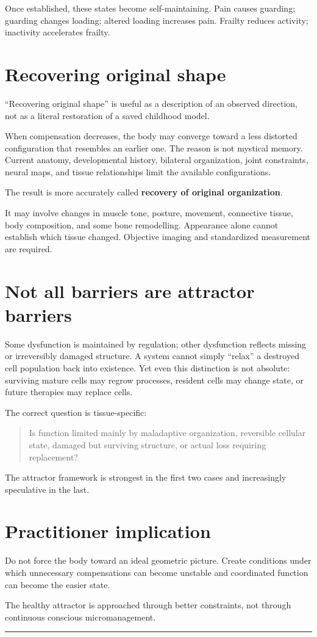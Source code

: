 Once established, these states become self-maintaining. Pain causes guarding; guarding changes loading; altered loading increases pain. Frailty reduces activity; inactivity accelerates frailty.

\section{Recovering original shape}

``Recovering original shape'' is useful as a description of an observed direction, not as a literal restoration of a saved childhood model.

When compensation decreases, the body may converge toward a less distorted configuration that resembles an earlier one. The reason is not mystical memory. Current anatomy, developmental history, bilateral organization, joint constraints, neural maps, and tissue relationships limit the available configurations.

The result is more accurately called \textbf{recovery of original organization}.

It may involve changes in muscle tone, posture, movement, connective tissue, body composition, and some bone remodelling. Appearance alone cannot establish which tissue changed. Objective imaging and standardized measurement are required.

\section{Not all barriers are attractor barriers}

Some dysfunction is maintained by regulation; other dysfunction reflects missing or irreversibly damaged structure. A system cannot simply ``relax'' a destroyed cell population back into existence. Yet even this distinction is not absolute: surviving mature cells may regrow processes, resident cells may change state, or future therapies may replace cells.

The correct question is tissue-specific:

\begin{quote}
Is function limited mainly by maladaptive organization, reversible cellular state, damaged but surviving structure, or actual loss requiring replacement?
\end{quote}

The attractor framework is strongest in the first two cases and increasingly speculative in the last.

\section{Practitioner implication}

Do not force the body toward an ideal geometric picture. Create conditions under which unnecessary compensations can become unstable and coordinated function can become the easier state.

The healthy attractor is approached through better constraints, not through continuous conscious micromanagement.

\begin{center}\rule{0.5\linewidth}{0.5pt}\end{center}
